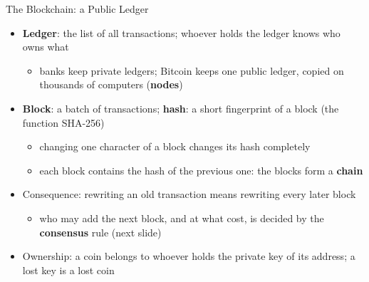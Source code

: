 \begin{frame}{The Blockchain: a Public Ledger}
\itemsize{\small}
\begin{itemize}
    \item \textbf{Ledger}: the list of all transactions; whoever holds the ledger knows who owns what
    \begin{itemize}
        \item banks keep private ledgers; Bitcoin keeps one public ledger, copied on thousands of computers (\textbf{nodes})
    \end{itemize}
    \item \textbf{Block}: a batch of transactions; \textbf{hash}: a short fingerprint of a block (the function SHA-256)
    \begin{itemize}
        \item changing one character of a block changes its hash completely
        \item each block contains the hash of the previous one: the blocks form a \textbf{chain}
    \end{itemize}
    \item Consequence: rewriting an old transaction means rewriting every later block
    \begin{itemize}
        \item who may add the next block, and at what cost, is decided by the \textbf{consensus} rule (next slide)
    \end{itemize}
    \item Ownership: a coin belongs to whoever holds the private key of its address; a lost key is a lost coin
\end{itemize}
\end{frame}

